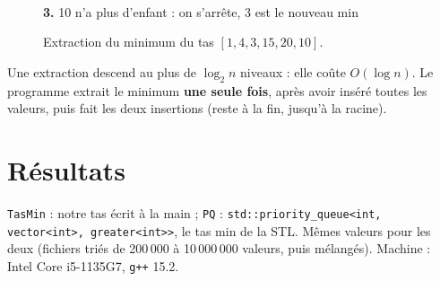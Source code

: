 \documentclass[11pt,a4paper]{article}
\begin{document}
\begin{figure}[H]
\hfill
\begin{minipage}[t]{0.32\textwidth}\centering
{}\\[2pt]
\small \textbf{3.} 10 n'a plus d'enfant : on s'arrête, 3 est le nouveau min
\end{minipage}
\caption{Extraction du minimum du tas $[1, 4, 3, 15, 20, 10]$.}
\end{figure}

Une extraction descend au plus de $\log_2 n$ niveaux : elle coûte $O(\log n)$. Le programme
extrait le minimum \textbf{une seule fois}, après avoir inséré toutes les valeurs, puis fait
les deux insertions (reste à la fin, jusqu'à la racine).

\section{Résultats}

\texttt{TasMin} : notre tas écrit à la main ; \texttt{PQ} :
\texttt{std::priority\_queue<int, vector<int>, greater<int>>}, le tas min de la STL. Mêmes
valeurs pour les deux (fichiers triés de 200\,000 à 10\,000\,000 valeurs, puis mélangés).
Machine : Intel Core i5-1135G7, \texttt{g++} 15.2.
\end{document}
